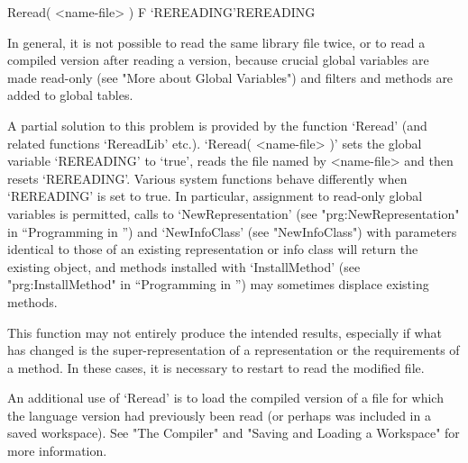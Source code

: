 \>Reread( <name-file> ) F
\>`REREADING'{REREADING}

In general, it is not possible to read the same {\GAP} library file
twice, or to read a compiled version after reading a {\GAP} version,
because crucial global variables are made read-only (see "More about
Global Variables") and filters and methods are added to global tables.

A partial solution to this problem is provided by the function
`Reread' (and related functions `RereadLib' etc.).  `Reread(
<name-file> )' sets the global variable `REREADING' to `true', reads
the file named by <name-file> and then resets `REREADING'. Various
system functions behave differently when `REREADING' is set to
true. In particular, assignment to read-only global variables is
permitted, calls to `NewRepresentation' (see "prg:NewRepresentation"
in ``Programming in {\GAP}'') and
`NewInfoClass' (see "NewInfoClass") with parameters identical to those
of an existing representation or info class will return the existing
object, and methods installed with `InstallMethod' (see
"prg:InstallMethod" in ``Programming in {\GAP}'') may sometimes displace
existing methods.

This function may not entirely produce the intended results,
especially if what has changed is the super-representation of a
representation or the requirements of a method. In these cases, it is
necessary to restart {\GAP} to read the modified file.

An additional use of `Reread' is to load the compiled version of a
file for which the {\GAP} language version had previously been read
(or perhaps was included in a saved workspace). See "The Compiler" and 
"Saving and Loading a Workspace" for more information.


